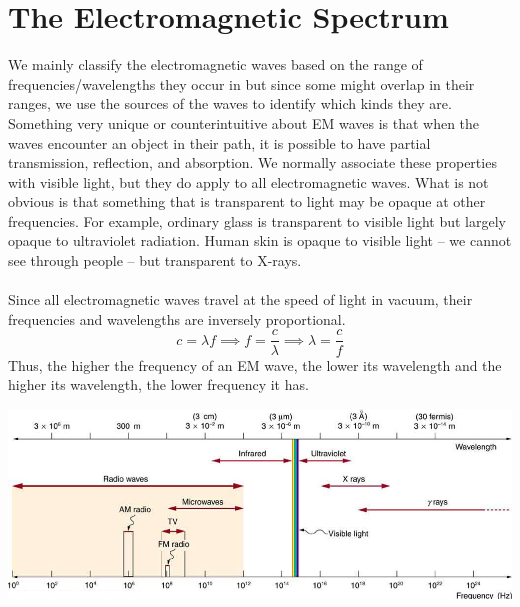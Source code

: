 \documentclass[11pt]{article}
\begin{document}
\section*{The Electromagnetic Spectrum}
We mainly classify the electromagnetic waves based on the range of frequencies/wavelengths they occur in but since some might overlap in their ranges, we use the sources of the waves to identify which kinds they are. Something very unique or counterintuitive about EM waves is that when the waves encounter an object in their path, it is possible to have partial transmission, reflection, and absorption. We normally associate these properties with visible light, but they do apply to all electromagnetic waves. What is not obvious is that something that is transparent to light may be opaque at other frequencies. For example, ordinary glass is transparent to visible light but largely opaque to ultraviolet radiation. Human skin is opaque to visible light -- we cannot see through people -- but transparent to X-rays. \\ \\
Since all electromagnetic waves travel at the speed of light in vacuum, their frequencies and wavelengths are inversely proportional.
$$c=\lambda f\implies f=\dfrac{c}{\lambda}\implies \lambda=\dfrac{c}{f}$$
Thus, the higher the frequency of an EM wave, the lower its wavelength and the higher its wavelength, the lower frequency it has.
\begin{center}
	\includegraphics[scale=0.8]{em_spectrum}
\end{center}
\end{document}
